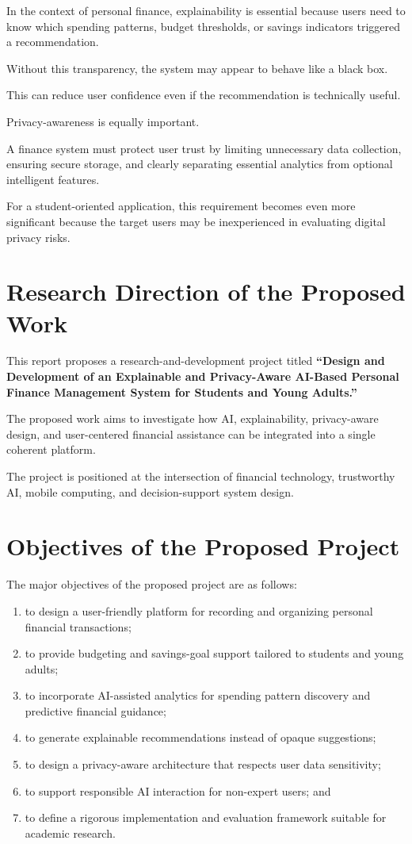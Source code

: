 \documentclass[12pt,a4paper]{report}
\begin{document}
In the context of personal finance,
explainability is essential because users need to know which spending patterns,
budget thresholds,
or savings indicators triggered a recommendation.

Without this transparency,
the system may appear to behave like a black box.

This can reduce user confidence even if the recommendation is technically useful.

Privacy-awareness is equally important.

A finance system must protect user trust by limiting unnecessary data collection,
ensuring secure storage,
and clearly separating essential analytics from optional intelligent features.

For a student-oriented application,
this requirement becomes even more significant because the target users may be inexperienced in evaluating digital privacy risks.

\section{Research Direction of the Proposed Work}
This report proposes a research-and-development project titled
\textbf{``Design and Development of an Explainable and Privacy-Aware AI-Based Personal Finance Management System for Students and Young Adults.''}

The proposed work aims to investigate how AI,
explainability,
privacy-aware design,
and user-centered financial assistance can be integrated into a single coherent platform.

The project is positioned at the intersection of financial technology,
trustworthy AI,
mobile computing,
and decision-support system design.

\section{Objectives of the Proposed Project}
The major objectives of the proposed project are as follows:
\begin{enumerate}[label=\arabic*.]
\item to design a user-friendly platform for recording and organizing personal financial transactions;
\item to provide budgeting and savings-goal support tailored to students and young adults;
\item to incorporate AI-assisted analytics for spending pattern discovery and predictive financial guidance;
\item to generate explainable recommendations instead of opaque suggestions;
\item to design a privacy-aware architecture that respects user data sensitivity;
\item to support responsible AI interaction for non-expert users; and
\item to define a rigorous implementation and evaluation framework suitable for academic research.
\end{enumerate}
\end{document}
